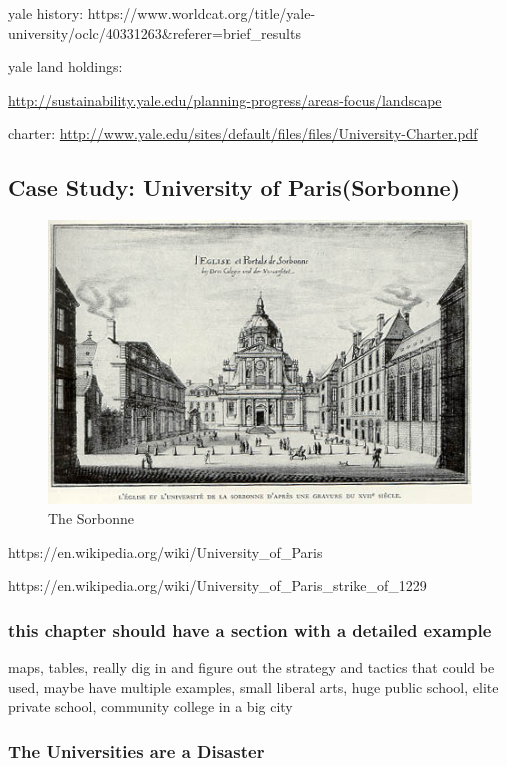 yale history:
https://www.worldcat.org/title/yale-university/oclc/40331263\&referer=brief\_results

yale land holdings:

\url{http://sustainability.yale.edu/planning-progress/areas-focus/landscape}

charter:
\url{http://www.yale.edu/sites/default/files/files/University-Charter.pdf}

\subsection{Case Study: University of
Paris(Sorbonne)}\label{case-study-university-of-parissorbonne}

\begin{figure}[htbp]
\centering
\includegraphics{images/Sorbonne_17thc.jpg}
\caption{The Sorbonne}
\end{figure}

https://en.wikipedia.org/wiki/University\_of\_Paris

https://en.wikipedia.org/wiki/University\_of\_Paris\_strike\_of\_1229

\subsubsection{this chapter should have a section with a detailed
example}\label{this-chapter-should-have-a-section-with-a-detailed-example}

maps, tables, really dig in and figure out the strategy and tactics that
could be used, maybe have multiple examples, small liberal arts, huge
public school, elite private school, community college in a big city

\subsubsection{The Universities are a
Disaster}\label{the-universities-are-a-disaster}


